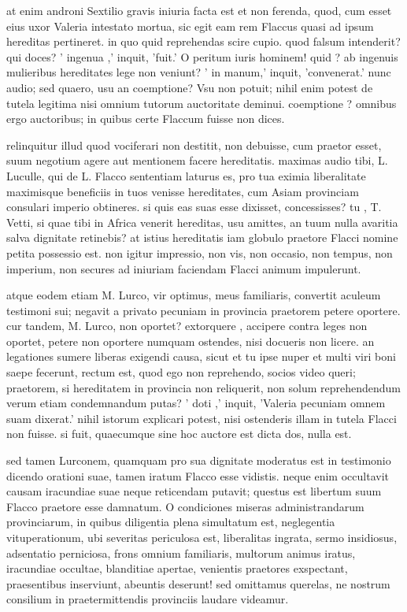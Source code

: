  at enim androni Sextilio gravis iniuria facta est et non ferenda, quod, cum esset eius uxor Valeria intestato mortua, sic egit eam rem Flaccus quasi ad ipsum hereditas pertineret. in quo quid reprehendas scire cupio. quod falsum intenderit? qui doces? ' ingenua ,' inquit, 'fuit.' O peritum iuris hominem! quid ? ab ingenuis mulieribus hereditates lege non veniunt? ' in manum,' inquit, 'convenerat.' nunc audio; sed quaero, usu an coemptione? Vsu non potuit; nihil enim potest de tutela legitima nisi omnium tutorum auctoritate deminui. coemptione ? omnibus ergo auctoribus; in quibus certe Flaccum fuisse non dices.

 relinquitur illud quod vociferari non destitit, non debuisse, cum praetor esset, suum negotium agere aut mentionem facere hereditatis. maximas audio tibi, L. Luculle, qui de L. Flacco sententiam laturus es, pro tua eximia liberalitate maximisque beneficiis in tuos venisse hereditates, cum Asiam provinciam consulari imperio obtineres. si quis eas suas esse dixisset, concessisses? tu , T. Vetti, si quae tibi in Africa venerit hereditas, usu amittes, an tuum nulla avaritia salva dignitate retinebis? at istius hereditatis iam globulo praetore Flacci nomine petita possessio est. non igitur impressio, non vis, non occasio, non tempus, non imperium, non secures ad iniuriam faciendam Flacci animum impulerunt.

 atque eodem etiam M. Lurco, vir optimus, meus familiaris, convertit aculeum testimoni sui; negavit a privato pecuniam in provincia praetorem petere oportere. cur tandem, M. Lurco, non oportet? extorquere , accipere contra leges non oportet, petere non oportere numquam ostendes, nisi docueris non licere. an legationes sumere liberas exigendi causa, sicut et tu ipse nuper et multi viri boni saepe fecerunt, rectum est, quod ego non reprehendo, socios video queri; praetorem, si hereditatem in provincia non reliquerit, non solum reprehendendum verum etiam condemnandum putas? ' doti ,' inquit, 'Valeria pecuniam omnem suam dixerat.' nihil istorum explicari potest, nisi ostenderis illam in tutela Flacci non fuisse. si fuit, quaecumque sine hoc auctore est dicta dos, nulla est.

 sed tamen Lurconem, quamquam pro sua dignitate moderatus est in testimonio dicendo orationi suae, tamen iratum Flacco esse vidistis. neque enim occultavit causam iracundiae suae neque reticendam putavit; questus est libertum suum Flacco praetore esse damnatum. O condiciones miseras administrandarum provinciarum, in quibus diligentia plena simultatum est, neglegentia vituperationum, ubi severitas periculosa est, liberalitas ingrata, sermo insidiosus, adsentatio perniciosa, frons omnium familiaris, multorum animus iratus, iracundiae occultae, blanditiae apertae, venientis praetores exspectant, praesentibus inserviunt, abeuntis deserunt! sed omittamus querelas, ne nostrum consilium in praetermittendis provinciis laudare videamur.

